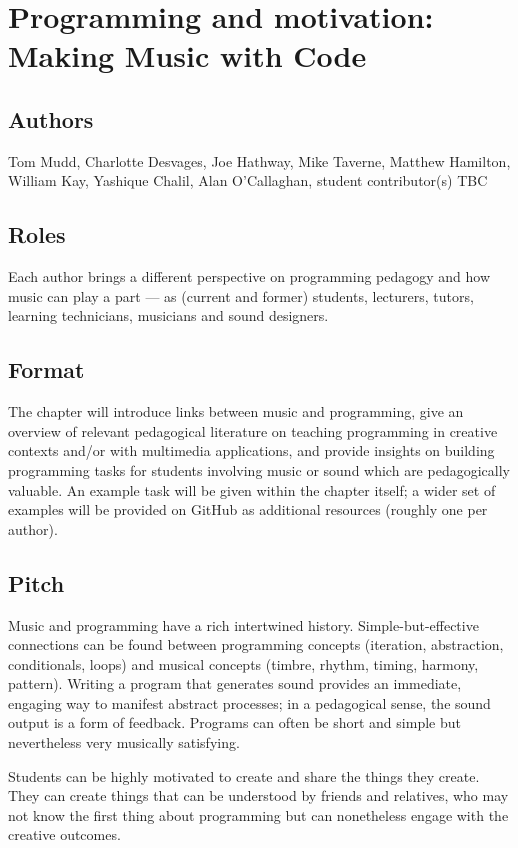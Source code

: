 \section*{Programming and motivation: Making Music with Code}

\subsection*{Authors}
Tom Mudd, Charlotte Desvages, Joe Hathway, Mike Taverne, Matthew Hamilton, William Kay, Yashique Chalil, Alan O'Callaghan, student contributor(s) TBC

\subsection*{Roles}
Each author brings a different perspective on programming pedagogy and how music can play a part --- as (current and former) students, lecturers, tutors, learning technicians, musicians and sound designers.

\subsection*{Format}
The chapter will introduce links between music and programming, give an overview of relevant pedagogical literature on teaching programming in creative contexts and/or with multimedia applications, and provide insights on building programming tasks for students involving music or sound which are pedagogically valuable. An example task will be given within the chapter itself; a wider set of examples will be provided on GitHub as additional resources (roughly one per author).

\subsection*{Pitch}
Music and programming have a rich intertwined history. Simple-but-effective connections can be found between programming concepts (iteration, abstraction, conditionals, loops) and musical concepts (timbre, rhythm, timing, harmony, pattern). Writing a program that generates sound provides an immediate, engaging way to manifest abstract processes; in a pedagogical sense, the sound output is a form of feedback. Programs can often be short and simple but nevertheless very musically satisfying. 

Students can be highly motivated to create and share the things they create. They can create things that can be understood by friends and relatives, who may not know the first thing about programming but can nonetheless engage with the creative outcomes. 

